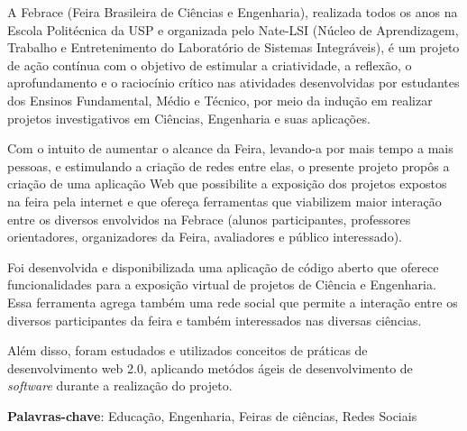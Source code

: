 
\begin{resumo}

A Febrace (Feira Brasileira de Ciências e Engenharia), realizada todos os anos na Escola Politécnica da USP e organizada pelo Nate-LSI (Núcleo de Aprendizagem, Trabalho e Entretenimento do Laboratório de Sistemas Integráveis), é um projeto de ação contínua com o objetivo de estimular a criatividade, a reflexão, o aprofundamento e o raciocínio crítico nas atividades desenvolvidas por estudantes dos Ensinos Fundamental, Médio e Técnico, por meio da indução em realizar projetos investigativos em Ciências, Engenharia e suas aplicações.

Com o intuito de aumentar o alcance da Feira, levando-a por mais tempo a mais pessoas, e estimulando a criação de redes entre elas, o presente projeto propôs a criação de uma aplicação Web que possibilite a exposição dos projetos expostos na feira pela internet e que ofereça ferramentas que viabilizem maior interação entre os diversos envolvidos na Febrace (alunos participantes, professores orientadores, organizadores da Feira, avaliadores e público interessado).

Foi desenvolvida e disponibilizada uma aplicação de código aberto que oferece funcionalidades para a exposição virtual de projetos de Ciência e Engenharia. Essa ferramenta agrega também uma rede social que permite a interação entre os diversos participantes da feira e também interessados nas diversas ciências.

Além disso, foram estudados e utilizados conceitos de práticas de desenvolvimento web 2.0, aplicando metódos ágeis de desenvolvimento de \textit{software} durante a realização do projeto.

\vspace{1.5ex}

{\bf Palavras-chave}: Educação, Engenharia, Feiras de ciências, Redes Sociais

\end{resumo}

